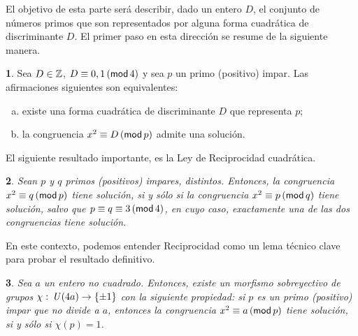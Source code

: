\theoremstyle{plain}
\newtheorem{teoMotivaReciprocidad}{\teoname}[section]
\newtheorem{lemaMotivaReciprocidad}[teoMotivaReciprocidad]{\lemaname}

\theoremstyle{definition}
\newtheorem{obsMotivaReciprocidad}[teoMotivaReciprocidad]{\obsname}


El objetivo de esta parte ser\'a describir, dado un entero $D$,
el conjunto de n\'umeros primos que son representados por alguna
forma cuadr\'atica de discriminante $D$.
El primer paso en esta direcci\'on se resume de la siguiente manera.

\begin{obsMotivaReciprocidad}\label{obs:motiva-reciprocidad}
	Sea $D\in\Enteros$, $D\equiv 0,1\tmodulo[4]$ y sea $p$
	un primo (positivo) impar. Las afirmaciones siguientes
	son equivalentes:
	\begin{enumerate}[(a)]
		\item\label{item:motiva-reciprocidad:representado}
			existe una forma cuadr\'atica de discriminante
			$D$ que representa $p$;
		\item\label{item:motiva-reciprocidad:residuo}
			la congruencia $x^2\equiv D\tmodulo[p]$ admite
			una soluci\'on.
	\end{enumerate}
\end{obsMotivaReciprocidad}

El siguiente resultado importante, es la Ley de Reciprocidad
cuadr\'atica.

\begin{lemaMotivaReciprocidad}\label{lema:motiva-reciprocidad}
	Sean $p$ y $q$ primos (positivos) impares, distintos.
	Entonces, la congruencia $x^2\equiv q\tmodulo[p]$
	tiene soluci\'on, si y s\'olo si la congruencia
	$x^2\equiv p\tmodulo[q]$ tiene soluci\'on,
	salvo que $p\equiv q\equiv 3\tmodulo[4]$, en cuyo
	caso, exactamente una de las dos congruencias
	tiene soluci\'on.
\end{lemaMotivaReciprocidad}

En este contexto, podemos entender Reciprocidad como un lema
t\'ecnico clave para probar el resultado definitivo.

\begin{teoMotivaReciprocidad}\label{teo:motiva-reciprocidad}
	Sea $a$ un entero no cuadrado. Entonces, existe un
	morfismo sobreyectivo de grupos
	$\chi:\,\Unidadesmod(4a)\rightarrow\{\pm 1\}$ con la
	siguiente propiedad:
	si $p$ es un primo (positivo) impar que no divide a $a$,
	entonces la congruencia $x^2\equiv a\tmodulo[p]$ tiene
	soluci\'on, si y s\'olo si $\chi(p)=1$.
\end{teoMotivaReciprocidad}


